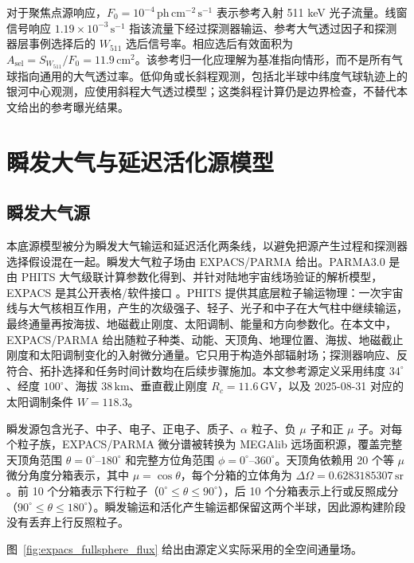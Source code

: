 \documentclass[preprint,12pt]{elsarticle}
\newcommand{\phcms}{\,\mathrm{ph\,cm^{-2}\,s^{-1}}}
\newcommand{\cps}{\,\mathrm{s^{-1}}}
\newcommand{\wii}{W_{511}}
\newcommand{\fzero}{F_{0}}
\begin{document}
对于聚焦点源响应，$\fzero=10^{-4}\phcms$ 表示参考入射 511 keV 光子流量。线窗信号响应 $1.19\times10^{-3}\cps$ 指该流量下经过探测器输运、参考大气透过因子和探测器层事例选择后的 $\wii$ 选后信号率。相应选后有效面积为 $A_{\mathrm{sel}}=S_{\wii}/\fzero=11.9\,\mathrm{cm^2}$。该参考归一化应理解为基准指向情形，而不是所有气球指向通用的大气透过率。低仰角或长斜程观测，包括北半球中纬度气球轨迹上的银河中心观测，应使用斜程大气透过模型；这类斜程计算仍是边界检查，不替代本文给出的参考曝光结果。

\section{瞬发大气与延迟活化源模型}
\label{sec:background}

\subsection{瞬发大气源}
\label{subsec:prompt_source}

本底源模型被分为瞬发大气输运和延迟活化两条线，以避免把源产生过程和探测器选择假设混在一起。瞬发大气粒子场由 EXPACS/PARMA 给出。PARMA3.0 是由 PHITS 大气级联计算参数化得到、并针对陆地宇宙线场验证的解析模型，EXPACS 是其公开表格/软件接口 \cite{Sato2015EXPACS,Sato2016PARMA4}。PHITS 提供其底层粒子输运物理：一次宇宙线与大气核相互作用，产生的次级强子、轻子、光子和中子在大气柱中继续输运，最终通量再按海拔、地磁截止刚度、太阳调制、能量和方向参数化。在本文中，EXPACS/PARMA 给出随粒子种类、动能、天顶角、地理位置、海拔、地磁截止刚度和太阳调制变化的入射微分通量。它只用于构造外部辐射场；探测器响应、反符合、拓扑选择和任务时间计数均在后续步骤施加。本文参考源定义采用纬度 $34^\circ$、经度 $100^\circ$、海拔 $38\,\mathrm{km}$、垂直截止刚度 $R_c=11.6\,\mathrm{GV}$，以及 2025-08-31 对应的太阳调制条件 $W=118.3$。

瞬发源包含光子、中子、电子、正电子、质子、$\alpha$ 粒子、负 $\mu$ 子和正 $\mu$ 子。对每个粒子族，EXPACS/PARMA 微分谱被转换为 MEGAlib 远场面积源，覆盖完整天顶角范围 $\theta=0^\circ$--$180^\circ$ 和完整方位角范围 $\phi=0^\circ$--$360^\circ$。天顶角依赖用 20 个等 $\mu$ 微分角度分箱表示，其中 $\mu=\cos\theta$，每个分箱的立体角为 $\Delta\Omega=0.6283185307\,\mathrm{sr}$。前 10 个分箱表示下行粒子（$0^\circ\leq\theta\leq90^\circ$），后 10 个分箱表示上行或反照成分（$90^\circ\leq\theta\leq180^\circ$）。瞬发输运和活化产生输运都保留这两个半球，因此源构建阶段没有丢弃上行反照粒子。

图~\ref{fig:expacs_fullsphere_flux} 给出由源定义实际采用的全空间通量场。
\end{document}
